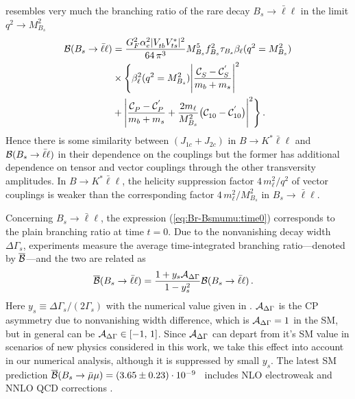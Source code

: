 \documentclass[twocolumn,epjc3]{svjour3}
\numberwithin{equation}{section}
\def \refeq#1{(\ref{#1})}
\newcommand{\wilson}[2][{}]{\mathcal{C}_{#2}^{\mathrm{#1}}}
\renewcommand{\[}{\big[}
\renewcommand{\]}{\big]}
\renewcommand{\(}{\big(}
\renewcommand{\)}{\big)}
\begin{document}
 resembles very much the branching ratio of the rare
decay $B_s \to \bar\ell\ell$ in the limit $q^2 \to M_{B_s}^2$
\begin{align}
\label{eq:Br-Bsmumu:time0}
  {\cal B}(B_s \to \bar\ell\ell) &=
    \frac{G_F^2 \alpha_e^2 |V_{tb}^{} V_{ts}^*|^2}{64\, \pi^3}
    M_{B_s}^5 f_{B_s}^2 \tau_{B_s} \beta_\ell(q^2 = M_{B_s}^2)
\nonumber\\
    & \times \Bigg\{
    \beta_\ell^2(q^2 = M_{B_s}^2) \Bigg|\frac{\wilson[]{S} - \wilson[']{S}}{m_b + m_s}\Bigg|^2 \nonumber\\
    &+ \Bigg|\frac{\wilson[]{P} - \wilson[']{P}}{m_b + m_s}
     + \frac{2 m_\ell}{M_{B_s}^2} \big(\wilson[]{10} - \wilson[']{10}\big) \Bigg|^2
    \Bigg\}\,.
  \end{align}
  Hence there is some similarity between $(J_{1c} + J_{2c})$ in $B \to K^*
  \bar\ell\ell$ and ${\cal B}(B_s \to \bar\ell\ell)$ in their dependence on the
  couplings but the former has additional dependence on tensor and vector
  couplings through the other transversity amplitudes.  In $B \to K^*
  \bar\ell\ell$, the helicity suppression factor $4\,m_\ell^2/q^2$ of vector
  couplings is weaker than the corresponding factor $4\,m_\ell^2/M_{B_s}^2$ in
  $B_s \to \bar\ell\ell$.

  Concerning $B_s\to \bar\ell\ell$, the expression \refeq{eq:Br-Bsmumu:time0}
  corresponds to the plain branching ratio at time $t=0$. Due to the
  nonvanishing decay width $\Delta\Gamma_s$, experiments measure the average
  time-integrated branching ratio---denoted by $\overline{\cal B}$---and the two
  are related as \cite{DeBruyn:2012wk}
\begin{align}
  \label{eq:Br-Bsmumu}
  \overline{\cal B} (B_s \to \bar\ell\ell) &
  = \frac{1 + y_s {\cal A}_{\Delta\Gamma}}{1 - y_s^2} {\cal B} (B_s \to \bar\ell\ell)\,.
\end{align}
Here $y_s \equiv \Delta\Gamma_s/(2\Gamma_s)$ with the numerical value given in
\cite{Beaujean:2013soa}. ${\cal A}_{\Delta\Gamma}$ is the CP asymmetry
due to nonvanishing width difference, which is ${\cal A}_{\Delta\Gamma} = 1$
in the SM, but in general can be ${\cal A}_{\Delta\Gamma} \in [-1,\, 1]$.
Since ${\cal A}_{\Delta\Gamma}$ can depart from it's SM value in scenarios of
new physics considered in this work, we take this effect into account
in our numerical analysis, although it is suppressed by small $y_s$. The latest
SM prediction $\overline{\cal B} (B_s \to \bar\mu\mu) = (3.65 \pm 0.23) \cdot
10^{-9}$~\cite{Bobeth:2013uxa} includes NLO electroweak \cite{Bobeth:2013tba}
and NNLO QCD corrections \cite{Hermann:2013kca}.
\end{document}
